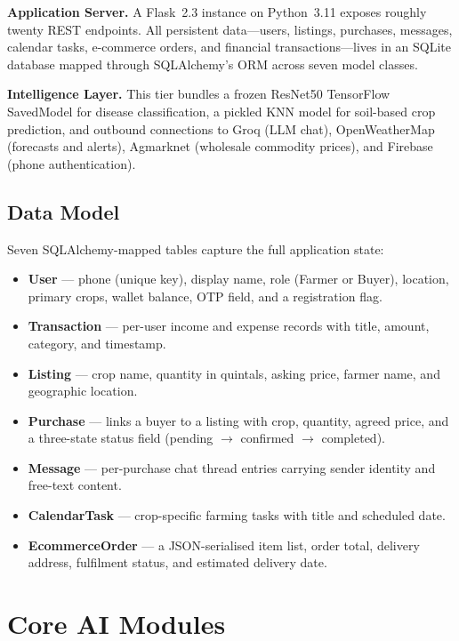 \documentclass[conference]{IEEEtran}
\begin{document}
\textbf{Application Server.} A Flask~2.3 instance on Python~3.11 exposes roughly twenty REST
endpoints. All persistent data---users, listings, purchases, messages, calendar tasks, e-commerce
orders, and financial transactions---lives in an SQLite database mapped through SQLAlchemy's ORM
across seven model classes.

\textbf{Intelligence Layer.} This tier bundles a frozen ResNet50 TensorFlow SavedModel for disease
classification, a pickled KNN model for soil-based crop prediction, and outbound connections to Groq
(LLM chat), OpenWeatherMap (forecasts and alerts), Agmarknet (wholesale commodity prices), and
Firebase (phone authentication).

\subsection{Data Model}
Seven SQLAlchemy-mapped tables capture the full application state:
\begin{itemize}
  \item \textbf{User} --- phone (unique key), display name, role (Farmer or Buyer),
  location, primary crops, wallet balance, OTP field, and a registration flag.
  \item \textbf{Transaction} --- per-user income and expense records with title,
  amount, category, and timestamp.
  \item \textbf{Listing} --- crop name, quantity in quintals, asking price, farmer
  name, and geographic location.
  \item \textbf{Purchase} --- links a buyer to a listing with crop, quantity, agreed
  price, and a three-state status field (pending $\rightarrow$ confirmed $\rightarrow$ completed).
  \item \textbf{Message} --- per-purchase chat thread entries carrying sender identity
  and free-text content.
  \item \textbf{CalendarTask} --- crop-specific farming tasks with title and scheduled date.
  \item \textbf{EcommerceOrder} --- a JSON-serialised item list, order total, delivery
  address, fulfilment status, and estimated delivery date.
\end{itemize}

\section{Core AI Modules}
\end{document}
